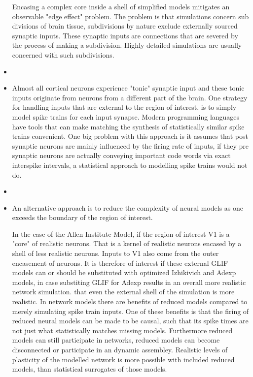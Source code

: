 \documentclass{article}
\begin{document}
\begin{itemize}
Encasing a complex core inside a shell of simplified models mitigates an observable "edge effect" problem. The problem is that simulations concern sub divisions of brain tissue, subdivisions by nature exclude externally sourced synaptic inputs. These synaptic inputs are connections that are severed by the process of making a subdivision. Highly detailed simulations are usually concerned with such subdivisions.

\item 
\item Almost all cortical neurons experience "tonic" synaptic input and these tonic inputs originate from neurons from a different part of the brain. One strategy for handling inputs that are external to the region of interest, is to simply model spike trains for each input synapse. Modern programming languages have tools that can make matching the synthesis of statistically similar spike trains convenient. One big problem with this approach is it assumes that post synaptic neurons are mainly influenced by the firing rate of inputs, if they pre synaptic neurons are actually conveying important code words via exact interspike intervals, a statistical approach to modelling spike trains would not do.
\item 
\item  An alternative approach is to reduce the complexity of neural models as one exceeds the boundary of the region of interest.

In the case of the Allen Institute Model, if the region of interest V1 is a "core" of realistic neurons. That is a kernel of realistic neurons encased by a shell of less realistic neurons. Inputs to V1 also come from the outer encasement of neurons. It is therefore of interest if these external GLIF models can or should be substituted with optimized Izhikivich and Adexp models, in case substiting GLIF for Adexp results in an overall more realistic network simulation. that even the external shell of the simulation is more realistic. In network models there are benefits of reduced models compared to merely simulating spike train inputs. One of these benefits is that the firing of reduced neural models can be made to be causal, such that its spike times are not just what statistically matches missing models. Furthermore reduced models can still participate in networks, reduced models can become disconnected or participate in an dynamic assembley. Realistic levels of plasticity of the modelled network is more possible with included reduced models, than statistical surrogates of those models.


\end{itemize}
\end{document}
